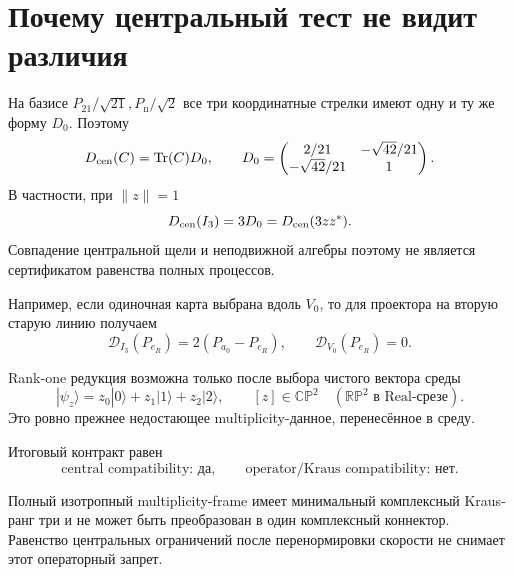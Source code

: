 \section{Почему центральный тест не видит различия}

На базисе $P_{21}/\sqrt{21},P_{\mathrm n}/\sqrt2$ все три координатные
стрелки имеют одну и ту же форму $D_0$. Поэтому
\begin{equation}
 D_{\rm cen}(C)=\operatorname{Tr}(C)D_0,
 \qquad
 D_0=\begin{pmatrix}
 2/21&-\sqrt{42}/21\\
 -\sqrt{42}/21&1
 \end{pmatrix}.
 \label{eq:v8-baryon-c0-central-restriction-sees-only-trace}
\end{equation}
В частности, при $\lVert z\rVert=1$
\begin{equation}
 D_{\rm cen}(I_3)=3D_0
 =D_{\rm cen}(3zz^*).
 \label{eq:v8-baryon-c0-central-single-map-false-equivalence}
\end{equation}
Совпадение центральной щели и неподвижной алгебры поэтому не является
сертификатом равенства полных процессов.

Например, если одиночная карта выбрана вдоль $V_0$, то для проектора на
вторую старую линию получаем
\begin{equation}
 \mathcal D_{I_3}(P_{e_R})
 =2(P_{a_0}-P_{e_R}),
 \qquad
 \mathcal D_{V_0}(P_{e_R})=0.
 \label{eq:v8-baryon-c0-operator-witness-full-versus-single}
\end{equation}

Rank-one редукция возможна только после выбора чистого вектора среды
\begin{equation}
 |\psi_z\rangle=z_0|0\rangle+z_1|1\rangle+z_2|2\rangle,
 \qquad [z]\in\mathbb{CP}^2
 \quad(\mathbb{RP}^2\text{ в Real-срезе}).
 \label{eq:v8-baryon-c0-environment-pure-state-selector}
\end{equation}
Это ровно прежнее недостающее multiplicity-данное, перенесённое в среду.

Итоговый контракт равен
\begin{equation}
 \text{central compatibility: да},
 \qquad
 \text{operator/Kraus compatibility: нет}.
 \label{eq:v8-baryon-c0-full-single-compatibility-ledger}
\end{equation}

\begin{theorem}
Полный изотропный multiplicity-frame имеет минимальный комплексный
Kraus-ранг три и не может быть преобразован в один комплексный коннектор.
Равенство центральных ограничений после перенормировки скорости не снимает
этот операторный запрет.
\end{theorem}

